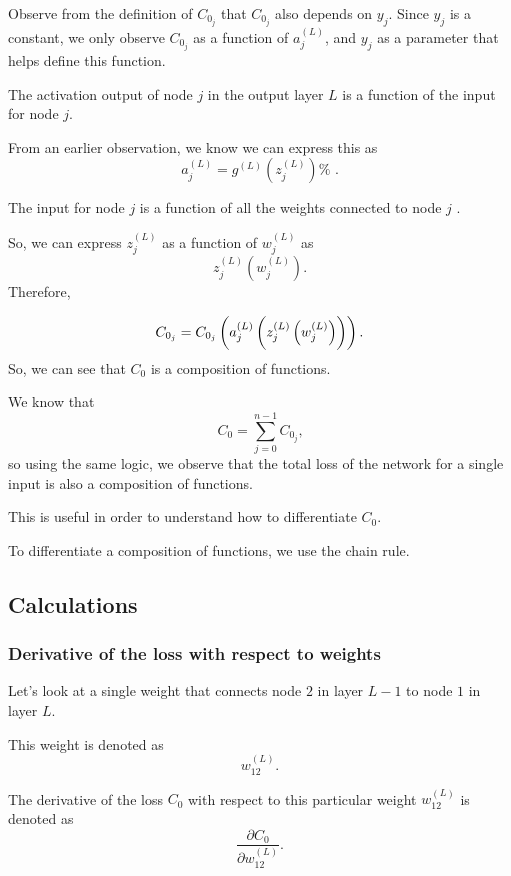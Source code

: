 \documentclass{article}
\begin{document}
Observe from the definition of $C_{0_{j}}$ that $C_{0_{j}}$ also depends on $%
y_{j}$. Since $y_{j}$ is a constant, we only observe $C_{0_{j}}$ as a
function of $a_{j}^{\left( L\right) }$, and $y_{j}$ as a parameter that
helps define this function.\newline
\newline

The activation output of node $j$ in the output layer $L$ is a function of
the input for node $j$.

From an earlier observation, we know we can express this as%
\[
a_{j}^{(L)}=g^{\left( L\right) }\left( z_{j}^{\left( L\right) }\right) \text{%
.} 
\]

The input for node $j$ is a function of all the weights connected to node $j$%
.

So, we can express $z_{j}^{\left( L\right) }$ as a function of $%
w_{j}^{\left( L\right) }$ as%
\[
z_{j}^{\left( L\right) }\left( w_{j}^{\left( L\right) }\right) \text{.} 
\]%
Therefore,

\[
C_{0_{j}}=C_{0_{j}}\left( a_{j}^{\left( L\right) }\left( 
\rule[-0.1in]{0in}{0.3in}z_{j}^{\left( L\right) }\left( w_{j}^{\left(
L\right) }\right) \right) \right) \text{.} 
\]%
So, we can see that $C_{0}$ is a composition of functions.

We know that 
\[
C_{0}=\sum_{j=0}^{n-1}C_{0_{j}}\text{,} 
\]%
so using the same logic, we observe that the total loss of the network for a
single input is also a composition of functions.

This is useful in order to understand how to differentiate $C_{0}$.

To differentiate a composition of functions, we use the chain rule.

\subsection{Calculations}

\subsubsection{Derivative of the loss with respect to weights}

Let's look at a single weight that connects node $2$ in layer $L-1$ to node $%
1$ in layer $L$.

This weight is denoted as%
\[
w_{12}^{\left( L\right) }\text{.} 
\]

The derivative of the loss $C_{0}$ with respect to this particular weight $%
w_{12}^{(L)}$ is denoted as%
\[
\frac{\partial C_{0}}{\partial w_{12}^{(L)}}\text{.} 
\]
\end{document}
